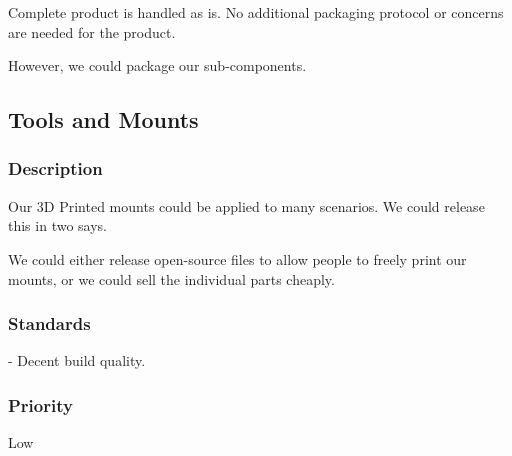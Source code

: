Complete product is handled as is. No additional packaging protocol or concerns are needed for the product.

However, we could package our sub-components.

\subsection{Tools and Mounts}
\subsubsection{Description}
Our 3D Printed mounts could be applied to many scenarios. We could release this in two says.

We could either release open-source files to allow people to freely print our mounts, or we could sell the individual parts cheaply. 
\subsubsection{Standards}
- Decent build quality.
\subsubsection{Priority}
Low